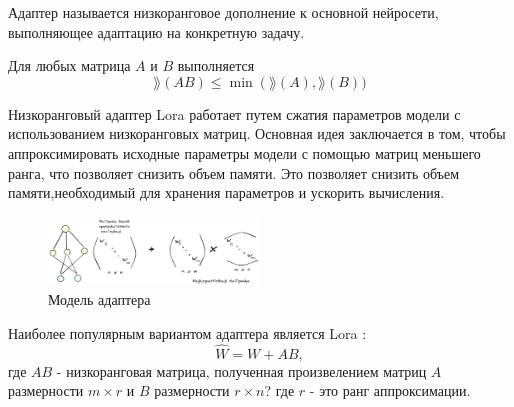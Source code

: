  Адаптер называется низкоранговое дополнение
к основной нейросети, выполняющее адаптацию на конкретную задачу.

Для любых матрица $A$ и $B$ выполняется
\begin{equation}
    \rang(𝐴𝐵) \le \min\left(\rang(𝐴),\rang(𝐵))
\end{equation}
   
Низкоранговый адаптер Lora работает путем сжатия 
параметров модели с использованием низкоранговых матриц. 
Основная идея заключается в том, 
чтобы аппроксимировать исходные параметры модели с
помощью матриц меньшего ранга, что позволяет снизить объем памяти.
Это позволяет снизить объем памяти,необходимый для хранения параметров и ускорить вычисления. 
\begin{figure}[h]
    \centering
    \includegraphics[width=0.5\textwidth]{assets/ml/adapter/adapter.excalidraw.png}
    \caption{Модель адаптера  \cite{hu2021lora}}
    \label{sd_learning}
\end{figure}

Наиболее популярным вариантом адаптера является Lora \cite{hu2021lora}:
\begin{equation}
    \hat{W} = W + AB,
\end{equation}
где  $AB$ - низкоранговая матрица, полученная произвелением 
матриц $A$ размерности \( m \times r \) и  $B$ размерности \( r \times n \)?
где \( r \) - это ранг аппроксимации.